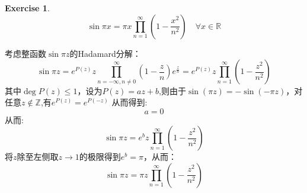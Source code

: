 \documentclass[a4paper,12pt]{ctexart}
\newenvironment{prooff}{{\noindent\it\textcolor{cyan!40!black}{Proof}:}\quad}{\par}
\newtheorem{exer}[defn]{Exercise}
\newcommand{\bb}[1]{\mathbb{#1}}
\begin{document}
\begin{exer}
    \begin{equation*}
        \sin \pi x=\pi x\prod_{n=1}^{\infty}(1-\frac{x^2}{n^2})\quad \forall x\in \bb{R}
    \end{equation*}
\end{exer}
\begin{prooff}
    考虑整函数$\sin \pi z$的Hadamard分解：
    \begin{equation*}
        \sin \pi z=e^{P(z)}z\prod_{n=-\infty,n\neq 0}^{\infty}(1-\frac{z}{n})e^{\frac{z}{n}}=e^{P(z)}z\prod_{n=1}^{\infty}(1-\frac{z^2}{n^2})
    \end{equation*}
    其中$\deg P(z)\le 1$，设为$P(z)=az+b$,则由于$\sin(\pi z)=-\sin (-\pi z)$，对任意$z\notin \bb{Z}$,有$e^{P(z)}=e^{P(-z)}$
    从而得到:
    \begin{equation*}
        a=0
    \end{equation*}
    从而:
    \begin{equation*}
        \sin \pi z=e^{b}z\prod_{n=1}^{\infty}(1-\frac{z^2}{n^2})
    \end{equation*}
    将$z$除至左侧取$z\to 1$的极限得到$e^b=\pi $，从而：
    \begin{equation*}
        \sin \pi z=\pi z\prod_{n=1}^{\infty}(1-\frac{z^2}{n^2})
    \end{equation*}
\end{prooff}
\end{document}

